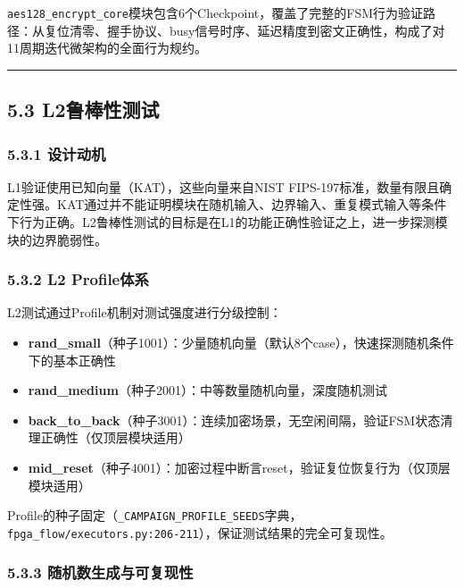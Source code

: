 \texttt{aes128\_encrypt\_core}模块包含6个Checkpoint，覆盖了完整的FSM行为验证路径：从复位清零、握手协议、busy信号时序、延迟精度到密文正确性，构成了对11周期迭代微架构的全面行为规约。

\begin{center}\rule{0.5\linewidth}{0.5pt}\end{center}

\subsection{5.3 L2鲁棒性测试}\label{l2ux9c81ux68d2ux6027ux6d4bux8bd5}

\subsubsection{5.3.1 设计动机}\label{ux8bbeux8ba1ux52a8ux673a-1}

L1验证使用已知向量（KAT），这些向量来自NIST
FIPS-197标准，数量有限且确定性强。KAT通过并不能证明模块在随机输入、边界输入、重复模式输入等条件下行为正确。L2鲁棒性测试的目标是在L1的功能正确性验证之上，进一步探测模块的边界脆弱性。

\subsubsection{5.3.2 L2 Profile体系}\label{l2-profileux4f53ux7cfb}

L2测试通过Profile机制对测试强度进行分级控制：

\begin{itemize}
\tightlist
\item
  \textbf{rand\_small}（种子1001）：少量随机向量（默认8个case），快速探测随机条件下的基本正确性
\item
  \textbf{rand\_medium}（种子2001）：中等数量随机向量，深度随机测试
\item
  \textbf{back\_to\_back}（种子3001）：连续加密场景，无空闲间隔，验证FSM状态清理正确性（仅顶层模块适用）
\item
  \textbf{mid\_reset}（种子4001）：加密过程中断言reset，验证复位恢复行为（仅顶层模块适用）
\end{itemize}

Profile的种子固定（\texttt{\_CAMPAIGN\_PROFILE\_SEEDS}字典，\texttt{fpga\_flow/executors.py:206-211}），保证测试结果的完全可复现性。

\subsubsection{5.3.3
随机数生成与可复现性}\label{ux968fux673aux6570ux751fux6210ux4e0eux53efux590dux73b0ux6027}

